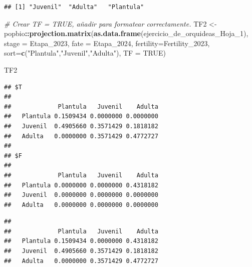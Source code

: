 \documentclass[
]{book}
\newenvironment{Shaded}{\begin{snugshade}}{\end{snugshade}}
\newcommand{\AttributeTok}[1]{\textcolor[rgb]{0.13,0.29,0.53}{#1}}
\newcommand{\CommentTok}[1]{\textcolor[rgb]{0.56,0.35,0.01}{\textit{#1}}}
\newcommand{\ConstantTok}[1]{\textcolor[rgb]{0.56,0.35,0.01}{#1}}
\newcommand{\FunctionTok}[1]{\textcolor[rgb]{0.13,0.29,0.53}{\textbf{#1}}}
\newcommand{\NormalTok}[1]{#1}
\newcommand{\OtherTok}[1]{\textcolor[rgb]{0.56,0.35,0.01}{#1}}
\newcommand{\SpecialCharTok}[1]{\textcolor[rgb]{0.81,0.36,0.00}{\textbf{#1}}}
\newcommand{\StringTok}[1]{\textcolor[rgb]{0.31,0.60,0.02}{#1}}
\theoremstyle{definition}
\theoremstyle{definition}
\theoremstyle{definition}
\theoremstyle{definition}
\theoremstyle{remark}
\begin{document}
\begin{verbatim}
## [1] "Juvenil"  "Adulta"   "Plantula"
\end{verbatim}

\begin{Shaded}
\begin{Highlighting}[]
\CommentTok{\# Crear TF = TRUE, añadir para formatear correctamente.}
\NormalTok{TF2 }\OtherTok{\textless{}{-}}\NormalTok{ popbio}\SpecialCharTok{::}\FunctionTok{projection.matrix}\NormalTok{(}\FunctionTok{as.data.frame}\NormalTok{(ejercicio\_de\_orquideas\_Hoja\_1), }
                                \AttributeTok{stage =}\NormalTok{ Etapa\_2023, }
                                \AttributeTok{fate =}\NormalTok{ Etapa\_2024, }
                                \AttributeTok{fertility=}\NormalTok{Fertility\_2023, }
                                \AttributeTok{sort=}\FunctionTok{c}\NormalTok{(}\StringTok{"Plantula"}\NormalTok{,}\StringTok{"Juvenil"}\NormalTok{,}\StringTok{"Adulta"}\NormalTok{), }\AttributeTok{TF =} \ConstantTok{TRUE}\NormalTok{)}

\NormalTok{TF2}
\end{Highlighting}
\end{Shaded}

\begin{verbatim}
## $T
##           
##             Plantula   Juvenil    Adulta
##   Plantula 0.1509434 0.0000000 0.0000000
##   Juvenil  0.4905660 0.3571429 0.1818182
##   Adulta   0.0000000 0.3571429 0.4772727
## 
## $F
##           
##             Plantula   Juvenil    Adulta
##   Plantula 0.0000000 0.0000000 0.4318182
##   Juvenil  0.0000000 0.0000000 0.0000000
##   Adulta   0.0000000 0.0000000 0.0000000
\end{verbatim}

\begin{Shaded}
\end{Shaded}

\begin{verbatim}
##           
##             Plantula   Juvenil    Adulta
##   Plantula 0.1509434 0.0000000 0.4318182
##   Juvenil  0.4905660 0.3571429 0.1818182
##   Adulta   0.0000000 0.3571429 0.4772727
\end{verbatim}
\end{document}
